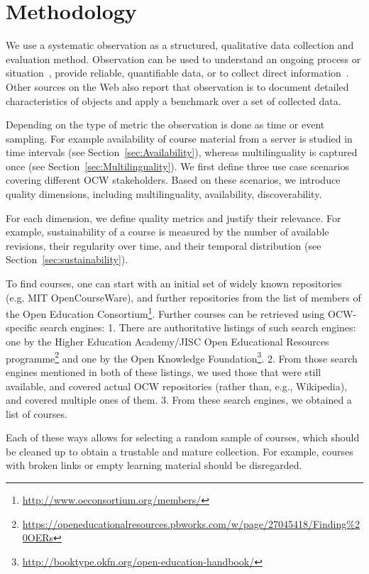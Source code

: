 \documentclass{sig-alternate}
\theoremstyle{definition}
\begin{document}
\noindent\section{Methodology}
\label{sec:survey-methodology}
We use a systematic observation as a structured, qualitative data collection and evaluation method.
Observation can be used to understand an ongoing process or situation~\parencite{Briefs.2008}, provide reliable, quantifiable data, or to collect direct information~\parencite{patton2005}.
Other sources on the Web also report that observation is to document detailed characteristics of objects
and apply a benchmark over a set of collected data.

Depending on the type of metric the observation is done as time or event sampling.
For example availability of course material from a server is studied in time intervals (see Section~\ref{sec:Availability}), whereas multilinguality is captured once (see Section~\ref{sec:Multilinguality}).
We first define three use case scenarios covering different OCW stakeholders.
Based on these scenarios, we introduce quality dimensions, including multilinguality, availability, discoverability.

For each dimension, we define quality metrics and justify their relevance.
For example, sustainability of a course is measured by the number of available revisions, their regularity over time, and their temporal distribution (see Section~\ref{sec:sustainability}).

To find courses, one can start with an initial set of widely known repositories (e.g. MIT OpenCourseWare), and further repositories from the list of members of the Open Education Consortium\footnote{\url{http://www.oeconsortium.org/members/}}.
Further courses can be retrieved using OCW-specific search engines:
1. There are authoritative listings of such search engines: one by the Higher Education Academy/JISC Open Educational Resources programme\footnote{\url{https://openeducationalresources.pbworks.com/w/page/27045418/Finding\%20OERs}} and one by the Open Knowledge Foundation\footnote{\url{http://booktype.okfn.org/open-education-handbook/}}.
2. From those search engines mentioned in both of these listings, we used those that were still available, and covered actual OCW repositories (rather than, e.g., Wikipedia), and covered multiple ones of them.
3. From these search engines, we obtained a list of courses.

Each of these ways allows for selecting a random sample of courses, which should be cleaned up to obtain a trustable and mature collection.
For example, courses with broken links or empty learning material should be disregarded.
\end{document}
